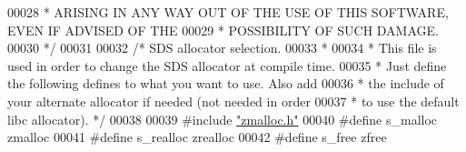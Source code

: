 \begin{DoxyCode}
00028 \textcolor{comment}{ * ARISING IN ANY WAY OUT OF THE USE OF THIS SOFTWARE, EVEN IF ADVISED OF THE}
00029 \textcolor{comment}{ * POSSIBILITY OF SUCH DAMAGE.}
00030 \textcolor{comment}{ */}
00031 
00032 \textcolor{comment}{/* SDS allocator selection.}
00033 \textcolor{comment}{ *}
00034 \textcolor{comment}{ * This file is used in order to change the SDS allocator at compile time.}
00035 \textcolor{comment}{ * Just define the following defines to what you want to use. Also add}
00036 \textcolor{comment}{ * the include of your alternate allocator if needed (not needed in order}
00037 \textcolor{comment}{ * to use the default libc allocator). */}
00038 
00039 \textcolor{preprocessor}{#}\textcolor{preprocessor}{include} \hyperlink{zmalloc_8h}{"zmalloc.h"}
00040 \textcolor{preprocessor}{#}\textcolor{preprocessor}{define} \textcolor{preprocessor}{s\_malloc} \textcolor{preprocessor}{zmalloc}
00041 \textcolor{preprocessor}{#}\textcolor{preprocessor}{define} \textcolor{preprocessor}{s\_realloc} \textcolor{preprocessor}{zrealloc}
00042 \textcolor{preprocessor}{#}\textcolor{preprocessor}{define} \textcolor{preprocessor}{s\_free} \textcolor{preprocessor}{zfree}
\end{DoxyCode}
